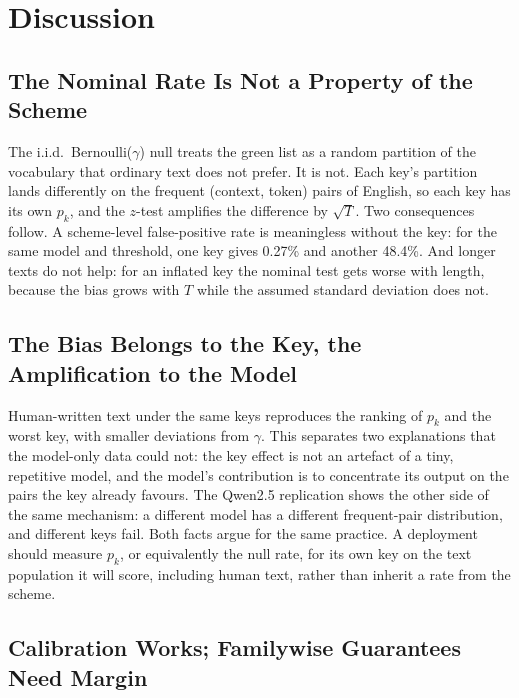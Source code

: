 \documentclass[conference]{IEEEtran}
\begin{document}
\section{Discussion}

\subsection{The Nominal Rate Is Not a Property of the Scheme}

The i.i.d.\ Bernoulli($\gamma$) null treats the green list as a random partition
of the vocabulary that ordinary text does not prefer. It is not. Each key's partition
lands differently on the frequent (context, token) pairs of English, so each key
has its own $p_k$, and the $z$-test amplifies the difference by $\sqrt{T}$. Two
consequences follow. A scheme-level false-positive rate is meaningless without
the key: for the same model and threshold, one key gives 0.27\% and another
48.4\%. And longer texts do not help: for an inflated key the nominal test gets
worse with length, because the bias grows with $T$ while the assumed standard
deviation does not.

\subsection{The Bias Belongs to the Key, the Amplification to the Model}

Human-written text under the same keys reproduces the ranking of $p_k$ and the
worst key, with smaller deviations from $\gamma$. This separates two explanations
that the model-only data could not: the key effect is not an artefact of a tiny,
repetitive model, and the model's contribution is to concentrate its output on
the pairs the key already favours. The Qwen2.5 replication shows the other side of
the same mechanism: a different model has a different frequent-pair distribution,
and different keys fail. Both facts argue for the same practice. A deployment
should measure $p_k$, or equivalently the null rate, for its own key on the text
population it will score, including human text, rather than inherit a rate from
the scheme.

\subsection{Calibration Works; Familywise Guarantees Need Margin}
\end{document}
